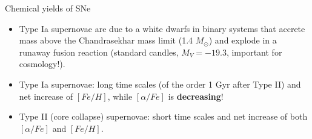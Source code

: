 \documentclass[letterpaper,landscape]{slides}
\begin{document}
\begin{slide}
{\begin{minipage}[t]{11cm}
\begin{center}
\end{center}
\end{minipage}

\begin{minipage}[t]{13cm}
\begin{center}
\vskip -1in
{\large \color{blue} Chemical yields of SNe}
\end{center}
\begin{itemize}
\item Type Ia supernovae are due to a white dwarfs in binary systems that accrete 
mass above the Chandrasekhar mass limit (1.4 $M_\odot$) and explode in a runaway 
fusion reaction (standard candles, $M_V=-19.3$, important for cosmology!). 
\item Type Ia supernovae: long time scales (of the order 1 Gyr after Type II) and net increase 
of $[Fe/H]$, while $[\alpha/Fe]$ is {\bf decreasing}! 
\item
Type II (core collapse) supernovae: short time scales and net increase 
of both $[\alpha/Fe]$ and $[Fe/H]$. 
\end{itemize}  

\end{minipage}}
\vfill 
\end{slide}
\end{document}
